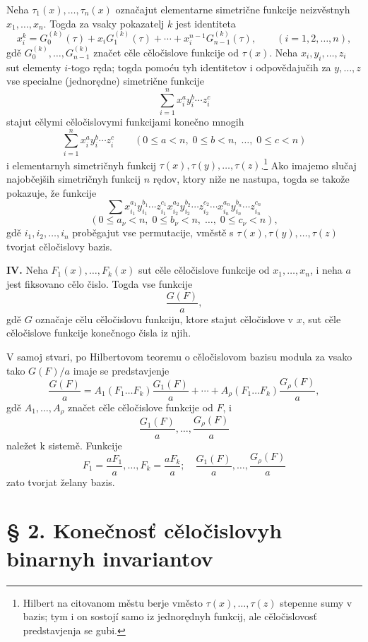 \documentclass[11pt]{article}
\begin{document}
Neha \(\tau_1(x),\ldots,\tau_n(x)\) označajut elementarne simetrične funkcije neizvěstnyh \(x_1,\ldots,x_n\). Togda za vsaky pokazatelj \(k\) jest identiteta
\[
        x_i^k = G_0^{(k)}(\tau)+x_iG_1^{(k)}(\tau)+\cdots+x_i^{n-1}G_{n-1}^{(k)}(\tau),
        \qquad (i=1,2,\ldots,n),
\]
gdě \(G_0^{(k)},\ldots,G_{n-1}^{(k)}\) značet cěle cěločislove funkcije od \(\tau(x)\). Neha \(x_i,y_i,\ldots,z_i\) sut elementy \(i\)-togo ręda; togda pomoću tyh identitetov i odpovědajučih za \(y,\ldots,z\) vse specialne (jednorędne) simetrične funkcije
\[
        \sum_{i=1}^n x_i^{a}y_i^{b}\cdots z_i^{c}
\]
stajut cělymi cěločislovymi funkcijami konečno mnogih
\[
        \sum_{i=1}^n x_i^{a}y_i^{b}\cdots z_i^{c}
        \qquad
        (0\le a<n,\;0\le b<n,\;\ldots,\;0\le c<n)
\]
i elementarnyh simetričnyh funkcij \(\tau(x),\tau(y),\ldots,\tau(z)\).\footnote{Hilbert na citovanom městu berje vměsto \(\tau(x),\ldots,\tau(z)\) stepenne sumy v bazis; tym i on sostojí samo iz jednorędnyh funkcij, ale cěločislovosť predstavjenja se gubi.}
Ako imajemo slučaj najobčejših simetričnyh funkcij \(n\) rędov, ktory niže ne nastupa, togda se takože pokazuje, že funkcije
\[
        \sum x_{i_1}^{a_1}y_{i_1}^{b_1}\cdots z_{i_1}^{c_1}
              x_{i_2}^{a_2}y_{i_2}^{b_2}\cdots z_{i_2}^{c_2}
              \cdots
              x_{i_n}^{a_n}y_{i_n}^{b_n}\cdots z_{i_n}^{c_n}
\]
\[
        (0\le a_\nu<n,\;0\le b_\nu<n,\;\ldots,\;0\le c_\nu<n),
\]
gdě \(i_1,i_2,\ldots,i_n\) proběgajut vse permutacije, vměstě s \(\tau(x),\tau(y),\ldots,\tau(z)\) tvorjat cěločislovy bazis.

\textbf{IV.} Neha \(F_1(x),\ldots,F_k(x)\) sut cěle cěločislove funkcije od \(x_1,\ldots,x_n\), i neha \(a\) jest fiksovano cělo čislo. Togda vse funkcije
\[
        \frac{G(F)}{a},
\]
gdě \(G\) označaje cělu cěločislovu funkciju, ktore stajut cěločislove v \(x\), sut cěle cěločislove funkcije konečnogo čisla iz njih.

V samoj stvari, po Hilbertovom teoremu o cěločislovom bazisu modula za vsako tako \(G(F)/a\) imaje se predstavjenje
\[
 \frac{G(F)}{a}
 =
 A_1(F_1\ldots F_k)\frac{G_1(F)}{a}
 +\cdots+
 A_\rho(F_1\ldots F_k)\frac{G_\rho(F)}{a},
\]
gdě \(A_1,\ldots,A_\rho\) značet cěle cěločislove funkcije od \(F\), i
\[
        \frac{G_1(F)}{a},\ldots,\frac{G_\rho(F)}{a}
\]
naležet k sistemě. Funkcije
\[
        F_1=\frac{aF_1}{a},\ldots,F_k=\frac{aF_k}{a};
        \quad
        \frac{G_1(F)}{a},\ldots,\frac{G_\rho(F)}{a}
\]
zato tvorjat želany bazis.

\setcounter{equation}{0}
\section*{§ 2. Konečnosť cěločislovyh binarnyh invariantov}
\end{document}
